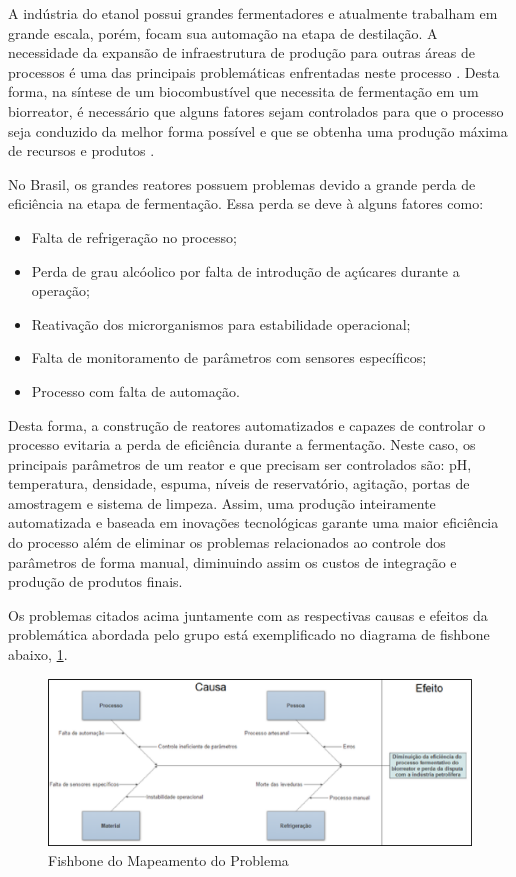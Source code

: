 A indústria do etanol possui grandes fermentadores e atualmente trabalham em grande escala, porém, focam sua automação na etapa de destilação. A necessidade da expansão de infraestrutura de produção para outras áreas de processos é uma das principais problemáticas enfrentadas neste processo \cite{lopes2008etanol}. Desta forma, na síntese de um biocombustível que necessita de fermentação em um biorreator, é necessário que alguns fatores sejam controlados para que o processo seja conduzido da melhor forma possível e que se obtenha uma produção máxima de recursos e produtos \cite{ribeiro2015fermentaccao}.

No Brasil, os grandes reatores possuem problemas devido a grande perda de eficiência na etapa de fermentação. Essa perda se deve à alguns fatores como:

\begin{itemize}
	\item Falta de refrigeração no processo;
	\item Perda de grau alcóolico por falta de introdução de açúcares durante a operação;
	\item Reativação dos microrganismos para estabilidade operacional;
	\item Falta de monitoramento de parâmetros com sensores específicos;
	\item Processo com falta de automação.
\end{itemize}

Desta forma, a construção de reatores automatizados e capazes de controlar o processo evitaria a perda de eficiência durante a fermentação. Neste caso, os principais parâmetros de um reator e que precisam ser controlados são: pH, temperatura, densidade, espuma, níveis de reservatório, agitação, portas de amostragem e sistema de limpeza. Assim, uma produção inteiramente automatizada e baseada em inovações tecnológicas garante uma maior eficiência do processo além de eliminar os problemas relacionados ao controle dos parâmetros de forma manual, diminuindo assim os custos de integração e produção de produtos finais.

Os problemas citados acima juntamente com as respectivas causas e efeitos da problemática abordada pelo grupo está exemplificado no diagrama de fishbone abaixo, \ref{fishbone}.

\begin{figure}[h]
	\centering
	\includegraphics[keepaspectratio=true,scale=0.8]{figuras/fishbone.eps}
	\caption{Fishbone do Mapeamento do Problema}
	\label{fishbone}
\end{figure}

